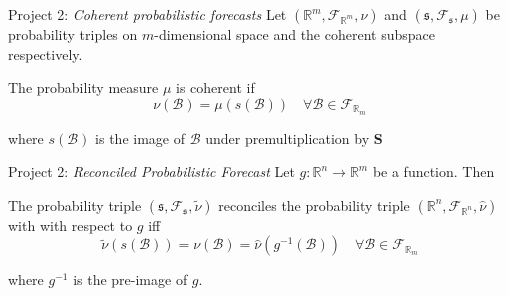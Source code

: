 \documentclass[11pt,xcolor=dvipsnames,table]{beamer} %
\begin{document}
  \begin{frame}{Project 2: \textit{Coherent probabilistic forecasts}}
Let $(\mathbb{R}^m,\mathcal{F}_{\mathbb{R}^m},\nu)$ and $(\mathfrak{s},\mathcal{F}_{\mathfrak{s}},\mu)$ be probability triples on $m$-dimensional space and the coherent subspace respectively.
\begin{definition}
	The probability measure $\mu$ is coherent if
	\begin{equation*}
	\nu(\mathcal{B})=\mu(s(\mathcal{B}))\quad\forall\mathcal{B}\in \mathcal{F}_{\mathbb{R}_m}
	\end{equation*} 
\end{definition}
where $s(\mathcal{B})$ is the image of $\mathcal{B}$ under premultiplication by ${\bm S}$
\end{frame}

\begin{frame}{Project 2: \textit{Reconciled Probabilistic Forecast}}
Let $g:\mathbb{R}^n\rightarrow\mathbb{R}^m$ be a function.  Then 
\begin{definition}
	The probability triple $\left(\mathfrak{s},\mathcal{F}_{\mathfrak{s}},\tilde{\nu}\right)$ reconciles the probability triple $\left(\mathbb{R}^n,\mathcal{F}_{\mathbb{R}^n},\hat{\nu}\right)$ with with respect to $g$ iff
	\begin{equation*}
	\tilde{\nu}(s(\mathcal{B}))=\nu(\mathcal{B})=\hat{\nu}(g^{-1}(\mathcal{B}))\quad\forall \mathcal{B}\in\mathcal{F}_{\mathbb{R}_m}
	\end{equation*}
\end{definition}
where $g^{-1}$ is the pre-image of $g$.
\end{frame}

\end{document}
